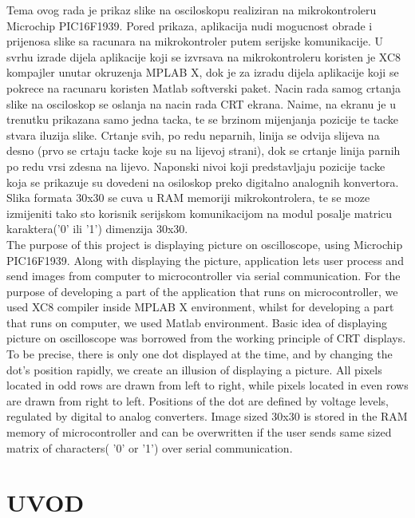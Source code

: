 \documentclass[12pt]{article}
\begin{document}
Tema ovog rada je prikaz slike na osciloskopu realiziran na mikrokontroleru Microchip PIC16F1939. Pored prikaza, aplikacija nudi mogucnost obrade i prijenosa slike sa racunara na mikrokontroler putem serijske komunikacije.
U svrhu izrade dijela aplikacije koji se izvrsava na mikrokontroleru koristen je XC8 kompajler unutar okruzenja MPLAB X, dok je za izradu dijela aplikacije koji se pokrece na racunaru koristen Matlab softverski paket.
Nacin rada samog crtanja slike na osciloskop se oslanja na nacin rada CRT ekrana. Naime, na ekranu je u trenutku prikazana samo jedna tacka, te se brzinom mijenjanja pozicije te tacke stvara iluzija slike. Crtanje svih, po redu neparnih, linija se odvija slijeva na desno (prvo se crtaju tacke koje su na lijevoj strani), dok se crtanje linija parnih po redu vrsi zdesna na lijevo.
Naponski nivoi koji predstavljaju pozicije tacke koja se prikazuje su dovedeni na osiloskop preko digitalno analognih konvertora.
Slika formata 30x30 se cuva u RAM memoriji mikrokontrolera, te se moze izmijeniti tako sto korisnik serijskom komunikacijom na modul posalje matricu karaktera('0' ili '1') dimenzija 30x30.
\newline\\
The purpose of this project is displaying picture on oscilloscope, using Microchip PIC16F1939. Along with displaying the picture, application lets user process and send images from computer to microcontroller via serial communication.
For the purpose of developing a part of the application that runs on microcontroller, we used XC8 compiler inside MPLAB X environment, whilst for developing a part that runs on computer, we used Matlab environment.
Basic idea of displaying picture on oscilloscope was borrowed from the working principle of CRT displays. To be precise, there is only one dot displayed at the time, and by changing the dot's position rapidly, we create an illusion of displaying a picture. All pixels located in odd rows are drawn from left to right, while pixels located in even rows are drawn from right to left.
Positions of the dot are defined by voltage levels, regulated by digital to analog converters.
Image sized 30x30 is stored in the RAM memory of microcontroller and can be overwritten if the user sends same sized matrix of characters( '0' or '1') over serial communication.




\pagebreak
\tableofcontents
\pagebreak
\section{UVOD}
\end{document}
